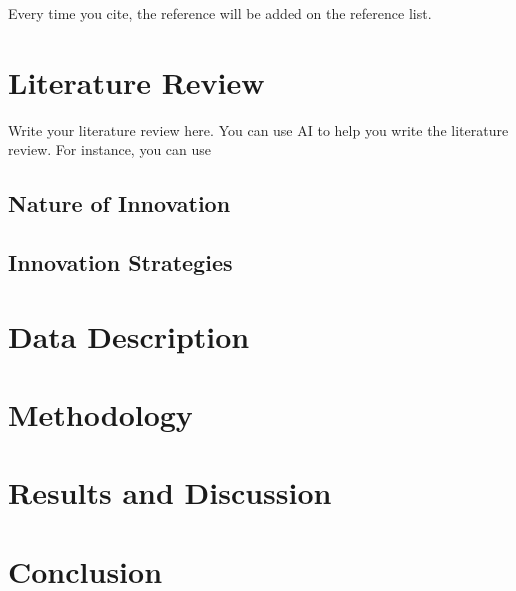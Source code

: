\documentclass[12pt, a4paper]{article}
\begin{document}
Every time you cite, the reference will be added on the reference list.



\section{Literature Review}

Write your literature review here. You can use
AI to help you write the literature review. For instance, you can use


\subsection{Nature of Innovation}

\subsection{Innovation Strategies}

\section{Data Description}

\blindtext

\section{Methodology}


\section{Results and Discussion}

\section{Conclusion}






\newpage


\end{document}
